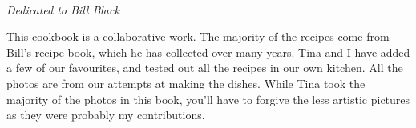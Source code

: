 \documentclass{tufte-book}
\begin{document}
\cleardoublepage
\tableofcontents


\cleardoublepage
~\vfill
\begin{doublespace}
\noindent\fontsize{18}{22}\selectfont\itshape
\nohyphenation
Dedicated to Bill Black
\end{doublespace}
\vfill
\vfill


\cleardoublepage
 

This cookbook is a collaborative work. The majority of the recipes come from Bill's recipe book, which he has collected over many years. Tina and I have added a few of our favourites, and tested out all the recipes in our own kitchen. All the photos are from our attempts at making the dishes. While Tina took the majority of the photos in this book, you'll have to forgive the less artistic pictures as they were probably my contributions.




\mainmatter
\end{document}
